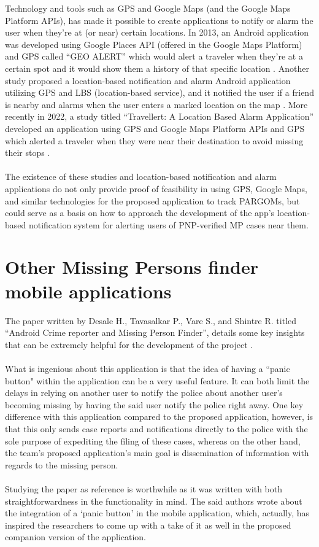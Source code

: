 Technology and tools such as GPS and Google Maps (and the Google Maps Platform APIs), has made it possible to create applications to notify or alarm the user when they’re at (or near) certain locations. In 2013, an Android application was developed using Google Places API (offered in the Google Maps Platform) and GPS called “GEO ALERT” which would alert a traveler when they’re at a certain spot and it would show them a history of that specific location \cite{garg2013geo}. Another study proposed a location-based notification and alarm Android application utilizing GPS and LBS (location-based service), and it notified the user if a friend is nearby and alarms when the user enters a marked location on the map \cite{kanfade2018location}. More recently in 2022, a study titled “Travellert: A Location Based Alarm Application” developed an application using GPS and Google Maps Platform APIs and GPS which alerted a traveler when they were near their destination to avoid missing their stops \cite{travellert}.
\\\\The existence of these studies and location-based notification and alarm applications do not only provide proof of feasibility in using GPS, Google Maps, and similar technologies for the proposed application to track PARGOMs, but could serve as a basis on how to approach the development of the app’s location-based notification system for alerting users of PNP-verified MP cases near them.


\section{Other Missing Persons finder mobile applications}

The paper written by Desale H., Tavasalkar P., Vare S., and Shintre R. titled “Android Crime reporter and Missing Person Finder”, details some key insights that can be extremely helpful for the development of the project \cite{desale2020android}.
\\\\What is ingenious about this application is that the idea of having a “panic button" within the application can be a very useful feature. It can both limit the delays in relying on another user to notify the police about another user's becoming missing by having the said user notify the police right away. One key difference with this application compared to the proposed application, however, is that this only sends case reports and notifications directly to the police with the sole purpose of expediting the filing of these cases, whereas on the other hand, the team’s proposed application’s main goal is dissemination of information with regards to the missing person.
\\\\Studying the paper as reference is worthwhile as it was written with both straightforwardness in the functionality in mind. The said authors wrote about the integration of a ‘panic button’ in the mobile application, which, actually, has inspired the researchers to come up with a take of it as well in the proposed companion version of the application. 

